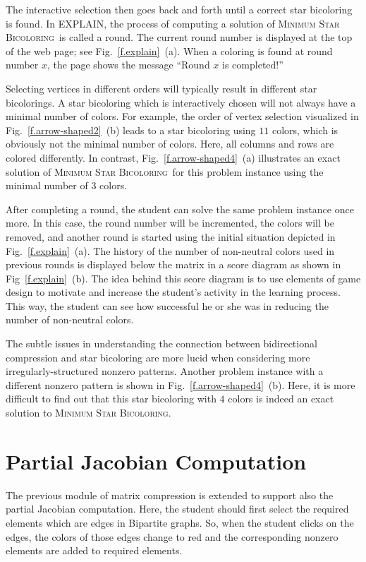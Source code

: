 \documentclass[12pt, twoside]{book}
\newcommand{\MinStaBic}{\textsc{Minimum Star Bicoloring}}
\begin{document}
The interactive selection then goes back and forth until a correct star bicoloring is
found. In EXPLAIN, the process of computing a solution of \MinStaBic\ is called a round.
The current round number is displayed at the top of the web page; see
Fig.~\ref{f.explain}~(a). When a coloring is found at round number $x$, the page shows
the message ``Round $x$ is completed!''

Selecting vertices in different orders will typically result in different star
bicolorings. A star bicoloring which is interactively chosen will not always have a
minimal number of colors. For example, the order of vertex selection visualized in
Fig.~\ref{f.arrow-shaped2}~(b) leads to a star bicoloring using $11$ colors, which is
obviously not the minimal number of colors. Here, all columns and rows are colored
differently. In contrast, Fig.~\ref{f.arrow-shaped4}~(a) illustrates an exact solution of
\MinStaBic\ for this problem instance using the minimal number of $3$ colors.

After completing a round, the student can solve the same problem instance once more. In
this case, the round number will be incremented, the colors will be removed, and another
round is started using the initial situation depicted in Fig.~\ref{f.explain}~(a). The
history of the number of non-neutral colors used in previous rounds is displayed below
the matrix in a score diagram as shown in Fig~\ref{f.explain}~(b). The idea behind this
score diagram is to use elements of game design to motivate and increase the student's
activity in the learning process. This way, the student can see how successful he or she
was in reducing the number of non-neutral colors.

The subtle issues in understanding the connection between bidirectional compression and
star bicoloring are more lucid when considering more irregularly-structured nonzero
patterns. Another problem instance with a different nonzero pattern is shown in
Fig.~\ref{f.arrow-shaped4}~(b). Here, it is more difficult to find out that this star
bicoloring with $4$ colors is indeed an exact solution to \MinStaBic.

\section{Partial Jacobian Computation}
The previous module of matrix compression is extended to support
also the partial Jacobian computation. Here, the student should
first select the required elements which are edges in Bipartite graphs.
So, when the student clicks on the edges, the colors of those edges change to red
and the corresponding nonzero elements are added to required elements.
\end{document}
